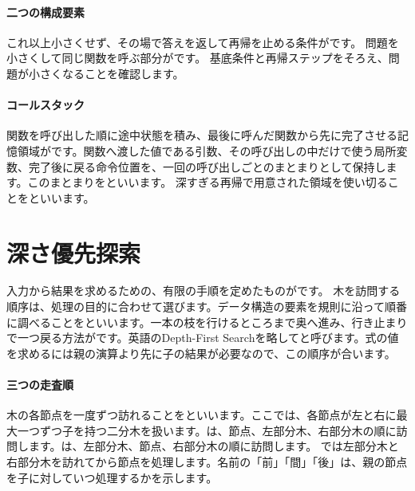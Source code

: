 \begingroup
\begingroup
\paragraph{二つの構成要素}
        これ以上小さくせず、その場で答えを返して再帰を止める条件がです。
        問題を小さくして同じ関数を呼ぶ部分がです。
        基底条件と再帰ステップをそろえ、問題が小さくなることを確認します。

\paragraph{コールスタック}
        関数を呼び出した順に途中状態を積み、最後に呼んだ関数から先に完了させる記憶領域がです。関数へ渡した値である引数、その呼び出しの中だけで使う局所変数、完了後に戻る命令位置を、一回の呼び出しごとのまとまりとして保持します。このまとまりをといいます。
        深すぎる再帰で用意された領域を使い切ることをといいます。

\par
\endgroup
\medskip
\begingroup
      \centering
\par
\endgroup
\par
\endgroup


\section{深さ優先探索}
\label{sec:02-language-11}

入力から結果を求めるための、有限の手順を定めたものがです。
木を訪問する順序は、処理の目的に合わせて選びます。データ構造の要素を規則に沿って順番に調べることをといいます。一本の枝を行けるところまで奥へ進み、行き止まりで一つ戻る方法がです。英語のDepth-First Searchを略してと呼びます。式の値を求めるには親の演算より先に子の結果が必要なので、この順序が合います。

\begingroup
\begingroup
\paragraph{三つの走査順}
        木の各節点を一度ずつ訪れることをといいます。ここでは、各節点が左と右に最大一つずつ子を持つ二分木を扱います。は、節点、左部分木、右部分木の順に訪問します。は、左部分木、節点、右部分木の順に訪問します。
        では左部分木と右部分木を訪れてから節点を処理します。名前の「前」「間」「後」は、親の節点を子に対していつ処理するかを示します。

